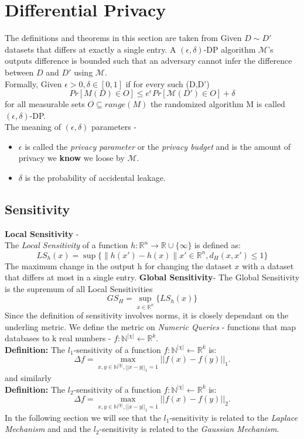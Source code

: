 \section{Differential Privacy}
The definitions and theorems in this section are taken from \cite{Dwork2014ThePrivacy}
Given $D \sim D'$ datasets that differs at exactly a single entry. A $(\epsilon,\delta)$-DP algorithm $\mathcal{M}$'s outputs difference is bounded such that an adversary cannot infer the difference between $D$ and $D'$ using  $\mathcal{M}$. \\
Formally, Given $\epsilon>0, \delta \in [0,1]$ if for every such (D,D')  
$$  Pr[M(D) \in O] \leq e^{\epsilon}Pr[\mathcal{M}(D') \in O]+ \delta$$ for all measurable sets $O \subseteq range(M)$ the randomized algorithm M is called $(\epsilon,\delta)$-DP. \\

The meaning of $(\epsilon, \delta)$ parameters - \\
\begin{itemize}
    \item $\epsilon$ is called the \textit{privacy parameter} or the \textit{privacy budget} and is the amount of privacy we \textbf{know} we loose by $\mathcal{M}$. 
    \item $\delta$ is the probability of accidental leakage.
\end{itemize}


\subsection{Sensitivity}
\textbf{Local Sensitivity} - \\
The \textit{Local Sensitivity} of a function $h:\mathbb{R}^{n}\rightarrow\mathbb{R} \cup \{\infty\}$ is defined as: 
$$LS_{h}(x)=\sup\{\|h(x')-h(x)\|x'\in\mathbb{R}^{n},d_{H}(x,x')\leq 1 \}$$
The maximum change in the output h for changing the dataset $x$ with a dataset that differs at most in a single entry.
\textbf{Global Sensitivity}-
The Global Sensitivity is the supremum of all Local Sensitivities 
$$GS_{H}=\sup\limits_{x\in\mathbb{R}^{n}}\{LS_{h}(x)\}$$
Since the definition of sensitivity involves norms, it is closely dependant on the underling metric. We define the metric on \textit{Numeric Queries} - functions that map databases to k real numbers -  $f: \mathbb{N}^{|\chi|} \leftarrow \mathbb{R}^{k}$.\\
\textbf{Definition:} The $l_{1}$-sensitivity of a function $f: \mathbb{N}^{|\chi|} \leftarrow \mathbb{R}^{k}$ is: 
$$ \Delta f = \max_{x,y \in \mathbb{N}^{|\chi|}, ||x-y||_{1}=1} || f(x) - f(y) ||_{1}.$$
and similarly \\
\textbf{Definition:} The $l_{2}$-sensitivity of a function $f: \mathbb{N}^{|\chi|} \leftarrow \mathbb{R}^{k}$ is: 
$$ \Delta f = \max_{x,y \in \mathbb{N}^{|\chi|}, ||x-y||_{1}=1} || f(x) - f(y) ||_{2}.$$
In the following section we will see that the $l_{1}$-sensitivity is related to the \textit{Laplace Mechanism} and and the $l_{2}$-sensitivity is related to the \textit{Gaussian Mechanism}.
